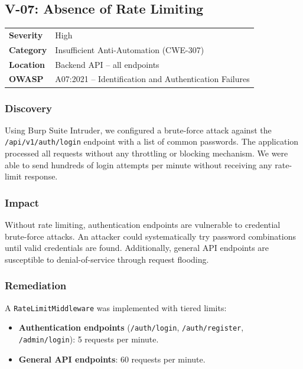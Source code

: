 \documentclass[12pt,a4paper]{article}
\begin{document}
\subsection{V-07: Absence of Rate Limiting}

\begin{table}[H]
\centering
\begin{tabularx}{\textwidth}{lX}
\toprule
\textbf{Severity} & \textcolor{high}{High} \\
\textbf{Category} & Insufficient Anti-Automation (CWE-307) \\
\textbf{Location} & Backend API -- all endpoints \\
\textbf{OWASP} & A07:2021 -- Identification and Authentication Failures \\
\bottomrule
\end{tabularx}
\end{table}

\subsubsection{Discovery}

Using Burp Suite Intruder, we configured a brute-force attack against the \texttt{/api/v1/auth/login} endpoint with a list of common passwords. The application processed all requests without any throttling or blocking mechanism. We were able to send hundreds of login attempts per minute without receiving any rate-limit response.

\subsubsection{Impact}

Without rate limiting, authentication endpoints are vulnerable to credential brute-force attacks. An attacker could systematically try password combinations until valid credentials are found. Additionally, general API endpoints are susceptible to denial-of-service through request flooding.

\subsubsection{Remediation}

A \texttt{RateLimitMiddleware} was implemented with tiered limits:

\begin{itemize}
  \item \textbf{Authentication endpoints} (\texttt{/auth/login}, \texttt{/auth/register}, \texttt{/admin/login}): 5 requests per minute.
  \item \textbf{General API endpoints}: 60 requests per minute.
\end{itemize}
\end{document}
